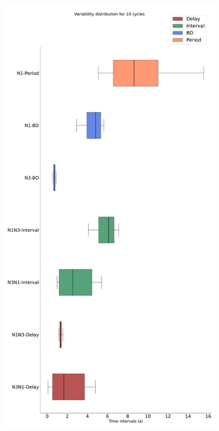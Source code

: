 \begin{figure}[htbp]
\begin{minipage}{0.9\textwidth}
\begin{minipage}[b]{0.45\textwidth}
			\includegraphics[width=\textwidth]{./invariants/data/SUSSEX/prep4_so_no_driven/images/prep4_so_no_driven_boxplot.pdf}
		\end{minipage}
		\begin{minipage}[b]{0.53\textwidth}

\end{minipage}
\end{minipage}
\end{figure}
